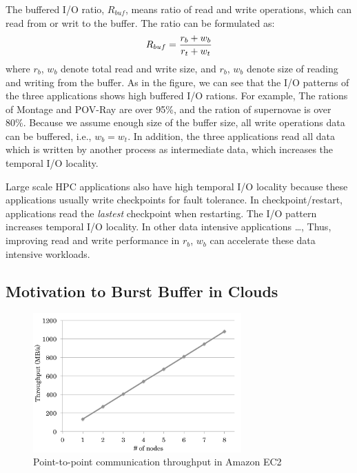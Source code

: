 The buffered I/O ratio, $R_{buf}$, means
ratio of read and write operations, which can read from or writ to the buffer.
The ratio can be formulated as:
\begin{equation}
R_{buf} = \frac{r_{b} + w_{b}}{r_{t} + w_{t}} \\
\end{equation}
where $r_{b}$, $w_{b}$ denote total read and write size, and $r_{b}$, $w_{b}$
denote size of reading and writing from the buffer. 
As in the figure, we can see that the I/O patterns of the three applications
shows high buffered I/O rations. For example, The rations of Montage and POV-Ray
are over 95\%, and the ration of supernovae is over 80\%.
Because we assume enough size of the buffer size, all write operations data can
be buffered, i.e., $w_{b} = w_{t}$.
 In addition, the three applications
read all data which is written by another process as intermediate data, which
increases the temporal I/O locality.
\par
 Large scale HPC applications also have high temporal I/O
locality because these applications usually write checkpoints for fault
tolerance. 
In checkpoint/restart, applications read the \emph{lastest} checkpoint when
restarting. The I/O pattern increases temporal I/O locality. 
In other data intensive applications \ldots, 
Thus, improving read and write performance in $r_{b}$, $w_{b}$ can accelerate
these data intensive workloads.



\subsection{Motivation to Burst Buffer in Clouds}
\label{ssec:network_s3}

\begin{figure}
\centering
\includegraphics[width=8cm]{img/point_to_point-2}
\caption{Point-to-point communication throughput in Amazon EC2}
\label{background:Amazon point to point throughput}
\end{figure}


